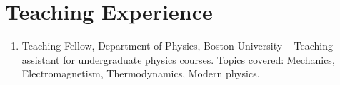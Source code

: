 
\section*{Teaching Experience}

\begin{enumerate}
 0cm \linewidth \listindent \dimexpr\linewidth-\listindent\relax
\item[] Teaching Fellow, Department of Physics, Boston University \hfill {} -- \newline
{Teaching assistant for undergraduate physics courses.  Topics covered: Mechanics, Electromagnetism, Thermodynamics, Modern physics.}

\end{enumerate}



